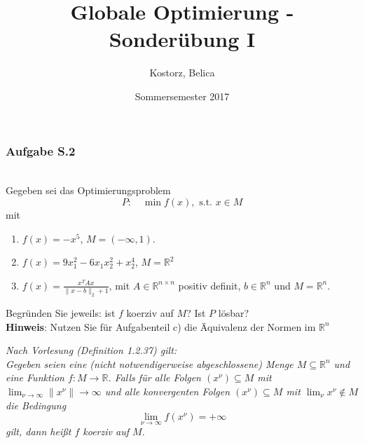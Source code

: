 \documentclass[12pt]{extreport} %
\title{Globale Optimierung - Sonderübung I}
\author{Kostorz, Belica}
\date{Sommersemester 2017}
\newcommand{\R}{\mathbb{R}}
\theoremstyle{named}
\theoremstyle{nnamed}
\theoremstyle{itshape}
\theoremstyle{normal}
\begin{document}
\thispagestyle{empty}


\subsubsection{Aufgabe S.2} ~\\
Gegeben sei das Optimierungsproblem
$$ P: \quad \min f(x), \text{ s.t. } x \in M $$
mit
\begin{enumerate}
	\item $f(x) = - x^5$, $M =(- \infty, 1)$.
	\item $f(x) = 9 x_1^2 - 6 x_1 x_2^2 + x_2^4$, $M = \R^2$
	\item $f(x) = \frac{x^T A x}{\| x - b\|_2 + 1}$, mit $A \in \R^{n \times n}$ positiv definit, $b \in \R^n$ und $M = \R^n$.
\end{enumerate}
	Begründen Sie jeweils: ist $f$ koerziv auf $M$? Ist $P$ lösbar? ~\\
	\textbf{Hinweis}: Nutzen Sie für Aufgabenteil c) die Äquivalenz der Normen im $\R^n$ ~\bigskip
	
	\textit{Nach Vorlesung (Definition 1.2.37) gilt:} ~\\
	\textit{Gegeben seien eine (nicht notwendigerweise abgeschlossene) Menge $M \subseteq \R^n$ und eine Funktion $f \colon M \rightarrow \R$. Falls für alle Folgen $(x^\nu) \subseteq M$ mit $\lim_{\nu \rightarrow \infty} \| x^\nu \| \rightarrow \infty$ und alle konvergenten Folgen $(x^\nu) \subseteq M$ mit $\lim_{\nu} x^\nu \notin M$ die Bedingung}
	$$ \lim_{\nu \rightarrow \infty} f(x^\nu) = + \infty $$
	\textit{gilt, dann heißt $f$ koerziv auf $M$.} ~\\
	
\end{document}
